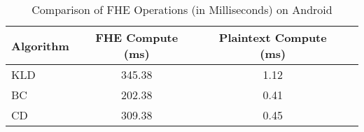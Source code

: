 \begin{table}[h!]
\centering
\begin{tabular}{|l|c|c|c|}
\hline
\textbf{Algorithm} & \textbf{FHE Compute (ms)} & \textbf{Plaintext Compute (ms)} \\
\hline
KLD & 345.38 & 1.12 \\
BC  & 202.38 & 0.41 \\
CD  & 309.38 & 0.45 \\
\hline
\end{tabular}
\caption{Comparison of FHE Operations (in Milliseconds) on Android}
\label{table:fhe_operations}
\end{table}
